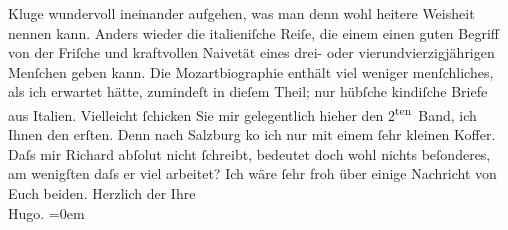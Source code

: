 \begin{ledgroupsized}[t]{13cm}
                    Kluge wundervoll ineinander aufgehen, was man denn wohl heitere {\pb}Weisheit nennen kann. Anders
                    wieder die italieniſche Reiſe, die einem einen
                    guten Begriff von der Friſche und kraftvollen Naivetät eines drei- oder
                    vierundvierzigjährigen Menſchen geben kann.\pend
           \pstart
           Die Mozartbiographie enthält viel
                    weniger menſchliches, als ich erwartet hätte, zumindeſt in dieſem Theil; nur
                    hübſche kindiſche Briefe aus Italien.
                    Vielleicht ſchicken Sie mir gelegentlich hieher den 2\textsuperscript{ten} Band, ich Ihnen {\pb}den erſten. Denn nach Salzburg ko{\geminationm} ich nur mit einem ſehr kleinen Koffer. Daſs mir
                        Richard abſolut nicht ſchreibt, bedeutet
                    doch wohl nichts beſonderes, am wenigſten daſs er viel arbeitet?\pend
           \pstart
           Ich wäre ſehr froh über einige Nachricht von Euch beiden.\pend
           \pstart
           Herzlich der Ihre{\\[\baselineskip]}\spacefill\mbox{Hugo.}\pend
           \leftskip=0em{}\endnumbering{}\end{ledgroupsized}  \newcommand{\dateiname}{L00693}\newcommand{\titel}{Hugo von Hofmannsthal an Arthur Schnitzler, 6. 7. [1897]}\newcommand{\editorInnen}{Martin Anton Müller und Gerd-Hermann Susen}
      